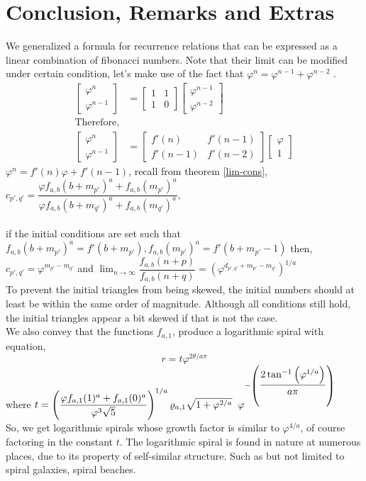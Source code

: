 \documentclass[preprint,12pt]{elsarticle}
\begin{document}
\section{Conclusion, Remarks and Extras}
We generalized a formula for recurrence relations that can be expressed as a linear combination of fibonacci numbers. Note that their limit can be modified under certain condition, let's make use of the fact that $\varphi^n = \varphi^{n-1}+\varphi^{n-2}$ \cite{PowerP}.\\
\begin{align*}
\begin{bmatrix}\varphi^n \\\varphi^{n-1}\end{bmatrix}
&=
\begin{bmatrix}1 & 1\\1 & 0\end{bmatrix}
\begin{bmatrix}\varphi^{n-1}\\\varphi^{n-2}\end{bmatrix}\\
\text{Therefore,}\\
\begin{bmatrix}\varphi^n \\\varphi^{n-1}\end{bmatrix}
&=
\begin{bmatrix}f'(n) & f'(n-1)\\f'(n-1) & f'(n-2)\end{bmatrix}
\begin{bmatrix}\varphi\\1\end{bmatrix}
\end{align*}
$\varphi^n = f'(n)\varphi+f'(n-1)$, recall from theorem \ref{lim-cons}, $c_{p',q'} = \dfrac{\varphi f_{a,b}(b+m_{p'})^a + f_{a,b}(m_{p'})^a}{\varphi f_{a,b}(b+m_{q'})^a + f_{a,b}(m_{q'})^a}$,\\\\
if the initial conditions are set such that $f_{a,b}(b+m_{p'})^a =f'(b+m_{p'}), f_{a,b}(m_{p'})^a = f'(b+m_{p'} -1)$ then, $c_{p',q'} = \varphi^{m_{p'}-m_{q'}}$ and $\displaystyle\lim_{n \to \infty} \dfrac{f_{a,b}(n + p)}{f_{a,b}(n + q)} = \left(\varphi^{d_{p',q'}+m_{p'}-m_{q'}}\right)^{1/a}$\\
To prevent the initial triangles from being skewed, the initial numbers should at least be within the same order of magnitude. Although all conditions still hold, the initial triangles appear a bit skewed if that is not the case.\\
We also convey that the functions $f_{a,1}$, produce a logarithmic spiral with equation, $$r = t\varphi^{2\theta/a\pi}$$ where $t=\left(\dfrac{\varphi f_{a,1}(1)^a+f_{a,1}(0)^a}{\varphi^{3}\sqrt{5}}\right)^{1/a}\varrho_{a,1}\sqrt{1 + \varphi^{2/a}}\hspace{2mm}\varphi^{-\left(\dfrac{ 2\tan^{-1}{\left(\varphi^{1/a}\right)}}{a\pi}\right)}$\\
So, we get logarithmic spirals whose growth factor is similar to $\varphi^{4/a}$, of course factoring in the constant $t$. The logarithmic spiral is found in nature at numerous places, due to its property of self-similar structure. Such as but not limited to spiral galaxies\cite{paper5}, spiral beaches\cite{paper6}.
\end{document}
